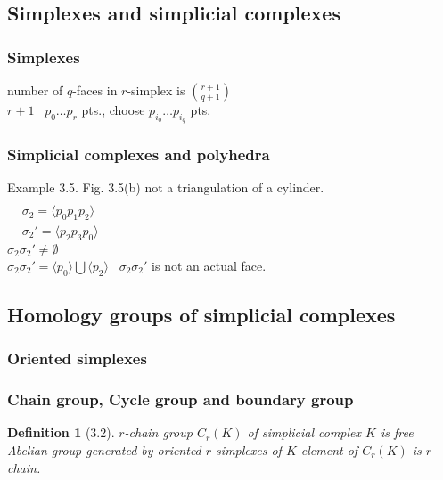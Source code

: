 \documentclass[twoside]{amsart}
\newtheorem{definition}{Definition}
\begin{document}
\subsection{Simplexes and simplicial complexes}

\subsubsection{Simplexes}

number of $q$-faces in $r$-simplex is $\binom{r+1}{q+1}$ \\

$r+1$ \, $p_0 \dots p_r$ pts., choose $p_{i_0} \dots p_{i_q}$ pts.  

\subsubsection{Simplicial complexes and polyhedra}

Example 3.5. Fig. 3.5(b) not a triangulation of a cylinder.  \\
$\begin{aligned} & \quad \\ 
  & \sigma_2 = \langle p_0 p_1 p_2 \rangle \\ 
  & \sigma_2' = \langle p_2 p_3 p_0 \rangle \end{aligned}$ \\
$\sigma_2 \sigma_2' \neq \emptyset$\\
$\sigma_2 \sigma_2' = \langle p_0 \rangle \bigcup \langle p_2 \rangle$ \quad \, $\sigma_2 \sigma_2'$ is not an actual face.  



\subsection{Homology groups of simplicial complexes}

\subsubsection{Oriented simplexes}

\subsubsection{Chain group, Cycle group and boundary group}

\begin{definition}[3.2] $r$-chain group $C_r(K)$ of simplicial complex $K$ is free Abelian group generated by oriented $r$-simplexes of $K$ element of $C_r(K)$ is $r$-chain.\end{definition}
\end{document}
